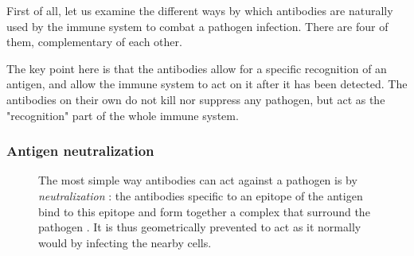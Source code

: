 First of all, let us examine the different ways by which
antibodies are naturally used by the immune system to combat
a pathogen infection. There are four of them, complementary of each other.

The key point here is that the antibodies allow for a specific recognition
of an antigen, and allow the immune system to act on it after it has
been detected. The antibodies on their own do not kill nor suppress any pathogen,
but act as the "recognition" part of the whole immune system.

\subsubsection{Antigen neutralization}

\begin{figure}[H]
    \begin{minipage}{0.55\textwidth}
        The most simple way antibodies can act against a pathogen is by
        \emph{neutralization} : the antibodies specific to an epitope of the
        antigen bind to this epitope and form together a complex that surround
        the pathogen \cite{langermans_antimicrobial_1994}.
        It is thus geometrically prevented to act as it normally would 
        by infecting the nearby cells.


\end{minipage}
\end{figure}
